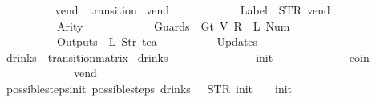 \begin{isabellebody}
{\ \ \ \ \ \ \ \ {\isasymrparr}{\isachardoublequoteclose}\isanewline
\isanewline
{}\isamarkupfalse%
\ vend\ {\isacharcolon}{\isacharcolon}\ transition\ \isanewline
{\isachardoublequoteopen}vend\ {\isasymequiv}\ {\isasymlparr}\isanewline
\ \ \ \ \ \ \ \ \ \ Label\ {\isacharequal}\ {\isacharparenleft}STR\ {\isacharprime}{\isacharprime}vend{\isacharprime}{\isacharprime}{\isacharparenright}{\isacharcomma}\isanewline
\ \ \ \ \ \ \ \ \ \ Arity\ {\isacharequal}\ {}{\isacharcomma}\isanewline
\ \ \ \ \ \ \ \ \ \ Guards\ {\isacharequal}\ {\isacharbrackleft}Gt\ {\isacharparenleft}V\ {\isacharparenleft}R\ {}{\isacharparenright}{\isacharparenright}\ {\isacharparenleft}L\ {\isacharparenleft}Num\ {}{\isacharparenright}{\isacharparenright}{\isacharbrackright}{\isacharcomma}\isanewline
\ \ \ \ \ \ \ \ \ \ Outputs\ {\isacharequal}\ {\isacharbrackleft}L\ {\isacharparenleft}Str\ {\isacharprime}{\isacharprime}tea{\isacharprime}{\isacharprime}{\isacharparenright}{\isacharbrackright}{\isacharcomma}\isanewline
\ \ \ \ \ \ \ \ \ \ Updates\ {\isacharequal}\ {\isacharbrackleft}{\isacharbrackright}\isanewline
\ \ \ \ \ \ \ \ {\isasymrparr}{\isachardoublequoteclose}\isanewline
\isanewline
{}\isamarkupfalse%
\ drinks\ {\isacharcolon}{\isacharcolon}\ {\isachardoublequoteopen}transition{\isacharunderscore}matrix{\isachardoublequoteclose}\ \isanewline
{\isachardoublequoteopen}drinks\ {\isasymequiv}\ {\isacharbraceleft}{\isacharbar}\isanewline
\ \ \ \ \ \ \ \ \ \ \ \ {\isacharparenleft}{\isacharparenleft}{}{\isacharcomma}{}{\isacharparenright}{\isacharcomma}\ init{\isacharparenright}{\isacharcomma}\isanewline
\ \ \ \ \ \ \ \ \ \ \ \ {\isacharparenleft}{\isacharparenleft}{}{\isacharcomma}{}{\isacharparenright}{\isacharcomma}\ coin{\isacharparenright}{\isacharcomma}\isanewline
\ \ \ \ \ \ \ \ \ \ \ \ {\isacharparenleft}{\isacharparenleft}{}{\isacharcomma}{}{\isacharparenright}{\isacharcomma}\ vend{\isacharparenright}\isanewline
\ \ \ \ \ \ \ \ \ \ {\isacharbar}{\isacharbraceright}{\isachardoublequoteclose}%
}%
\isamarkupfalse%
\ possible{\isacharunderscore}steps{\isacharunderscore}init{\isacharcolon}\ {\isachardoublequoteopen}possible{\isacharunderscore}steps\ drinks\ {}\ {\isacharless}{\isachargreater}\ STR\ {\isacharprime}{\isacharprime}init{\isacharprime}{\isacharprime}\ {\isacharbrackleft}{\isacharbrackright}\ {\isacharequal}\ {\isacharbraceleft}{\isacharbar}{\isacharparenleft}{}{\isacharcomma}\ init{\isacharparenright}{\isacharbar}{\isacharbraceright}{\isachardoublequoteclose}\isanewline

\end{isabellebody}
